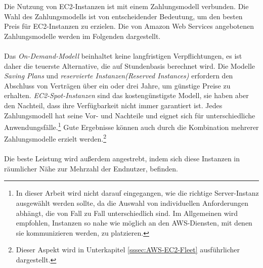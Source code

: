 Die Nutzung von EC2-Instanzen ist mit einem Zahlungsmodell verbunden. Die Wahl des Zahlungsmodells ist von entscheidender Bedeutung, um den besten Preis für EC2-Instanzen zu erzielen.
Die von Amazon Web Services angebotenen Zahlungsmodelle werden im Folgenden dargestellt.
\\\\
Das \textit{On-Demand-Modell} beinhaltet keine langfristigen Verpflichtungen, es ist daher die teuerste Alternative, die auf Stundenbasis berechnet wird. Die Modelle \textit{Saving Plans} und \textit{reservierte Instanzen(Reserved Instances)} erfordern den Abschluss von Verträgen über ein oder drei Jahre, um günstige Preise zu erhalten. \textit{EC2-Spot-Instanzen} sind das kostengünstigste Modell, sie haben aber den Nachteil, dass ihre Verfügbarkeit nicht immer garantiert ist. Jedes Zahlungsmodell hat seine Vor- und Nachteile und eignet sich für unterschiedliche Anwendungsfälle.\footnote{In dieser Arbeit wird nicht darauf eingegangen, wie die richtige Server-Instanz ausgewählt werden sollte, da die Auswahl von individuellen Anforderungen abhängt, die von Fall zu Fall unterschiedlich sind. Im Allgemeinen wird empfohlen, Instanzen so nahe wie möglich an den AWS-Diensten, mit denen sie kommunizieren werden, zu platzieren.} Gute Ergebnisse können auch durch die Kombination mehrerer Zahlungsmodelle erzielt werden.\footnote{Dieser Aspekt wird in Unterkapitel \ref{sssec:AWS-EC2-Fleet} ausführlicher dargestellt.} %
\\\\
Die beste Leistung wird außerdem angestrebt, indem sich diese Instanzen in räumlicher Nähe zur Mehrzahl der Endnutzer, befinden. 
